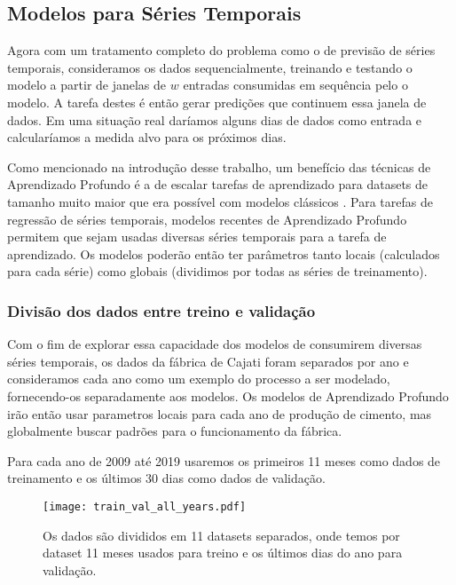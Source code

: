 \subsection{Modelos para Séries Temporais}


Agora com um tratamento completo do problema como o de previsão de séries
temporais, consideramos os dados sequencialmente, treinando e testando o modelo a partir de janelas de $w$
entradas consumidas em sequência pelo o modelo. A tarefa destes é então gerar
predições que continuem essa janela de dados. Em uma situação real daríamos
alguns dias de dados como entrada e calcularíamos a medida alvo para os próximos dias. 


Como mencionado na introdução desse trabalho, um benefício das técnicas de
Aprendizado Profundo é a de escalar tarefas de aprendizado para datasets de
tamanho muito maior que era possível com modelos clássicos \citep{dlbook}.
Para tarefas de regressão de séries temporais, modelos recentes de Aprendizado
Profundo permitem que sejam usadas diversas séries temporais para a tarefa de
aprendizado. Os modelos poderão então ter parâmetros tanto locais (calculados
para cada série) como globais (dividimos por todas as séries de treinamento).

\subsubsection{Divisão dos dados entre treino e validação}

Com o fim de explorar essa capacidade dos modelos de consumirem diversas séries
temporais, os dados da fábrica de Cajati foram separados por ano e consideramos
cada ano como um exemplo do processo a ser modelado, fornecendo-os separadamente
aos modelos. Os modelos de Aprendizado
Profundo irão então usar parametros locais para cada ano de produção de cimento,
mas globalmente buscar padrões para o funcionamento da fábrica. 

Para cada ano de 2009 até 2019 usaremos os primeiros 11 meses como dados de
treinamento e os últimos 30 dias como dados de validação.



\begin{figure}[H]
  \centering
  \texttt{[image: train\_val\_all\_years.pdf]} 
  \caption{Os dados são divididos em 11 datasets separados, onde temos por
    dataset 11 meses usados para treino e os últimos dias do ano para validação.} 
  \label{fig:trainvalallyears}
\end{figure}

